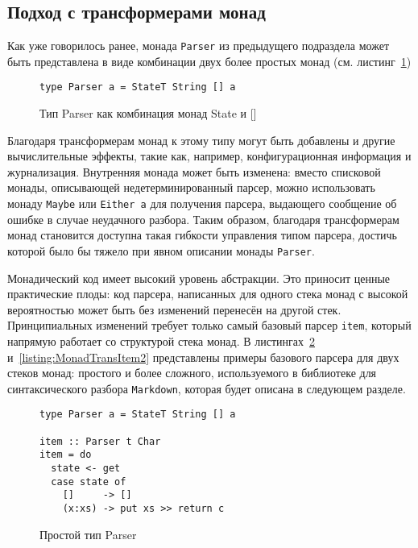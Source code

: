 \subsection{Подход с трансформерами монад}

Как уже говорилось ранее, монада \lstinline{Parser} из предыдущего подраздела 
может быть представлена в виде комбинации двух более простых монад 
(см. листинг~\ref{listing:MonadTransParser})

\begin{figure}[h]
\begin{lstlisting}
type Parser a = StateT String [] a
\end{lstlisting}
\caption{Тип Parser как комбинация монад State и []}
\label{listing:MonadTransParser}
\end{figure}

Благодаря трансформерам монад к этому типу могут быть добавлены и другие 
вычислительные эффекты, такие как, например, конфигурационная информация и 
журнализация. Внутренняя монада может быть изменена: вместо списковой монады, 
описывающей недетерминированный парсер, можно использовать монаду 
\lstinline{Maybe} или \lstinline{Either a} для получения парсера, выдающего 
сообщение об ошибке в случае неудачного разбора. Таким образом, благодаря 
трансформерам монад становится доступна такая гибкости управления типом парсера,
достичь которой было бы тяжело при явном описании монады \lstinline{Parser}.

Монадический код имеет высокий уровень абстракции. Это приносит ценные 
практические плоды: код парсера, написанных для одного стека монад с высокой 
вероятностью может быть без изменений перенесён на другой стек. Принципиальных 
изменений требует только самый базовый парсер \lstinline{item}, который напрямую
работает со структурой стека монад. В листингах~\ref{listing:MonadTransItem1}
и~\ref{listing:MonadTransItem2} представлены примеры базового парсера для двух
стеков монад: простого и более сложного, используемого в библиотеке для
синтаксического разбора \lstinline{Markdown}, которая будет описана в следующем 
разделе.

\begin{figure}[t]
\begin{lstlisting}
type Parser a = StateT String [] a

item :: Parser t Char
item = do
  state <- get
  case state of
    []     -> []
    (x:xs) -> put xs >> return c
\end{lstlisting}
\caption{Простой тип Parser}
\label{listing:MonadTransItem1}
\end{figure}

